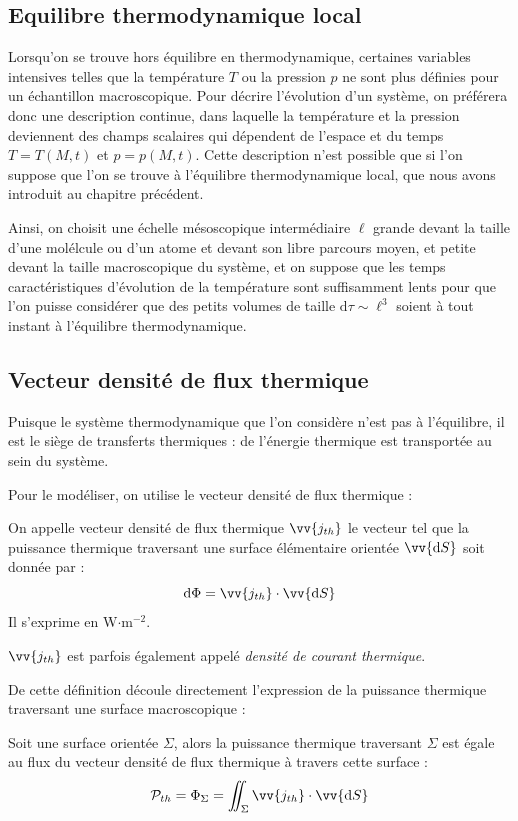 \documentclass[11pt,fleqn]{book} %
\newcommand{\dd}{\mathrm{d}}
\begin{document}
\subsection{Equilibre thermodynamique local}

Lorsqu'on se trouve hors équilibre en thermodynamique, certaines variables intensives telles que la température $T$ ou la pression $p$ ne sont plus définies pour un échantillon macroscopique. Pour décrire l'évolution d'un système, on préférera donc une description continue, dans laquelle la température et la pression deviennent des champs scalaires qui dépendent de l'espace et du temps $T = T(M,t)$ et $p = p(M,t)$. Cette description n'est possible que si l'on suppose que l'on se trouve à l'équilibre thermodynamique local, que nous avons introduit au chapitre précédent.

Ainsi, on choisit une échelle mésoscopique intermédiaire $\ell$ grande devant la taille d'une molélcule ou d'un atome et devant son libre parcours moyen, et petite devant la taille macroscopique du système, et on suppose que les temps caractéristiques d'évolution de la température sont suffisamment lents pour que l'on puisse considérer que des petits volumes de taille $\dd \tau \sim \ell^3$ soient à tout instant à l'équilibre thermodynamique.

\subsection{Vecteur densité de flux thermique}

Puisque le système thermodynamique que l'on considère n'est pas à l'équilibre, il est le siège de transferts thermiques : de l'énergie thermique est transportée au sein du système.

Pour le modéliser, on utilise le vecteur densité de flux thermique :
\begin{definition}
	On appelle vecteur densité de flux thermique $\vv{j_{th}}$ le vecteur tel que la puissance thermique traversant une surface élémentaire orientée $\vv{\dd S}$ soit donnée par :
	\begin{equation}
		\dd \Phi = \vv{j_{th}} \cdot \vv{\dd S}
	\end{equation}
	Il s'exprime en W$\cdot$m$^{-2}$.
\end{definition}
\begin{remark}
	$\vv{j_{th}}$ est parfois également appelé \textit{densité de courant thermique}.
\end{remark}
De cette définition découle directement l'expression de la puissance thermique traversant une surface macroscopique :
\begin{proposition}
	Soit une surface orientée $\Sigma$, alors la puissance thermique traversant $\Sigma$ est égale au flux du vecteur densité de flux thermique à travers cette surface :
	\begin{equation}
		\mathcal{P}_{th} = \Phi_\Sigma = \iint_{\Sigma} \vv{j_{th}} \cdot \vv{\dd S}
	\end{equation}
\end{proposition}
\end{document}

